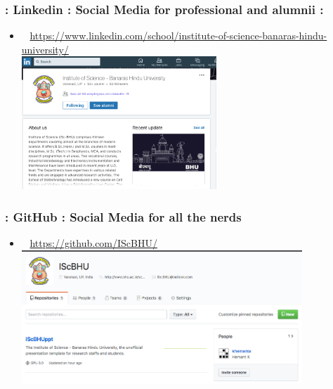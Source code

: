 \documentclass{beamer}
\begin{document}
\begin{frame}[fragile]
 \frametitle{\faLinkedinSquare: Linkedin : Social Media for professional and alumnii : }
 \begin{itemize}
	\item<+-> \faLinkedinSquare~ \url{https://www.linkedin.com/school/institute-of-science-banaras-hindu-university/} \\
	\visible<+->
	 	{%
	 	\includegraphics[height=5cm]{Resources/Linkedin.png} \\ %
	 	}
 \end{itemize}
\end{frame}

\begin{frame}
 \frametitle{\faGithubSquare: GitHub : Social Media for all the nerds }
 \begin{itemize}
	\item<+-> \faGithubSquare~ \url{https://github.com/IScBHU/} \\
	\visible<+->	
		{%
		\includegraphics[height=5cm]{Resources/Git.png} \\ %
		}
 \end{itemize}
\end{frame}
\end{document}
